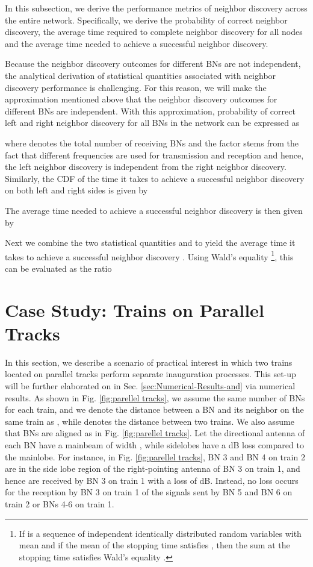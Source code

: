 \documentclass[10pt,english,two column]{IEEEtran}
\begin{document}
In this subsection, we derive the performance metrics of neighbor
discovery across the entire network. Specifically, we derive the probability
 of correct neighbor discovery, the average time 
required to complete neighbor discovery for all nodes and the average
time  needed to achieve a successful
neighbor discovery. 

Because the neighbor discovery outcomes for different BNs are not
independent, the analytical derivation of statistical quantities associated
with neighbor discovery performance is challenging. For this reason,
we will make the approximation mentioned above that the neighbor discovery
outcomes for different BNs are independent. With this approximation,
probability of correct left and right neighbor discovery for all  BNs
in the network can be expressed as 

where  denotes the total number of receiving BNs and the factor
 stems from the fact that different frequencies are used for transmission
and reception and hence, the left neighbor discovery is independent
from the right neighbor discovery. Similarly, the CDF of the time
it takes to achieve a successful neighbor discovery on both left and
right sides is given by 

The average time needed to achieve a successful neighbor discovery
 is then given by 



Next we combine the two statistical quantities  and
 to yield the average time it takes to
achieve a successful neighbor discovery .
Using Wald's equality \cite{Janssen}\footnote{If  is a sequence of independent identically
distributed random variables with mean  and if the
mean  of the stopping time  satisfies , then
the sum  at the stopping time 
satisfies Wald's equality . }, this can be evaluated as the ratio 




\section{Case Study: Trains on Parallel Tracks\label{sec:ND-parellel_tracks}}

In this section, we describe a scenario of practical interest in which
two trains located on parallel tracks perform separate inauguration
processes. This set-up will be further elaborated on in Sec. \ref{sec:Numerical-Results-and}
via numerical results. As shown in Fig. \ref{fig:parellel tracks},
we assume the same number of BNs for each train, and we denote the
distance between a BN and its neighbor on the same train as ,
while  denotes the distance between two trains. We also assume
that BNs are aligned as in Fig. \ref{fig:parellel tracks}. Let the
directional antenna of each BN have a mainbeam of width ,
while sidelobes have a  dB loss compared to the mainlobe. For
instance, in Fig. \ref{fig:parellel tracks}, BN 3 and BN 4 on train
2 are in the side lobe region of the right-pointing antenna of BN
3 on train 1, and hence are received by BN 3 on train 1 with a loss
of  dB. Instead, no loss occurs for the reception by BN 3 on train
1 of the signals sent by BN 5 and BN 6 on train 2 or BNs 4-6 on train
1. 
\end{document}
